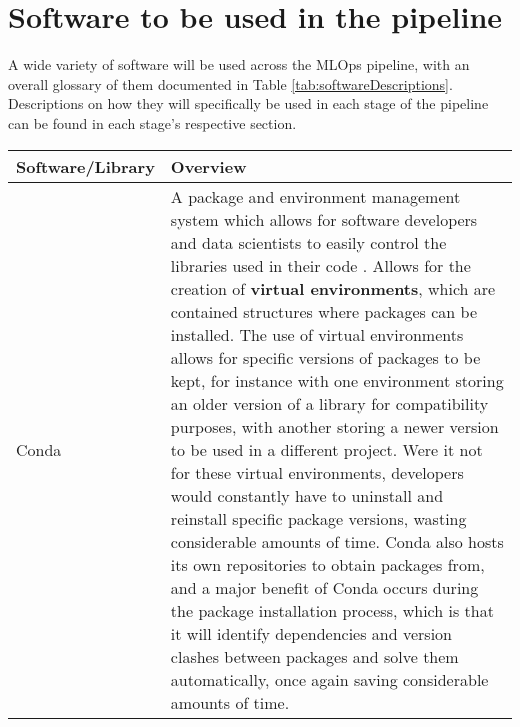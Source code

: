 
\section{Software to be used in the pipeline}
A wide variety of software will be used across the MLOps pipeline, with an overall glossary of them documented in Table \ref{tab:softwareDescriptions}.
Descriptions on how they will specifically be used in each stage of the pipeline can be found in each stage's respective
section.

\begin{longtable}{ |p{}| p{}|}
    \hline
    \cellcolor{blue!25}Software/Library & \cellcolor{blue!25}Overview\\
    \hline
    Conda 
    & A package and environment management system which allows 
    for software developers and data scientists to easily control the libraries used in their code \autocite{anaconda_about_nodate}. 
    Allows for the creation of \textbf{virtual environments}, which are contained structures where packages can be installed.
    The use of virtual environments allows for specific versions of packages to be kept, for instance with one environment 
    storing an older version of a library for compatibility purposes, with another storing a newer version to be used in a different project. 
    Were it not for these virtual environments, developers would constantly have to uninstall and reinstall specific package versions, wasting 
    considerable amounts of time. Conda also hosts its own repositories to obtain packages from, and a 
    major benefit of Conda occurs during the package installation process, which is that it will identify 
    dependencies and version clashes between packages and solve them automatically, once again saving 
    considerable amounts of time.
    

\end{longtable}
